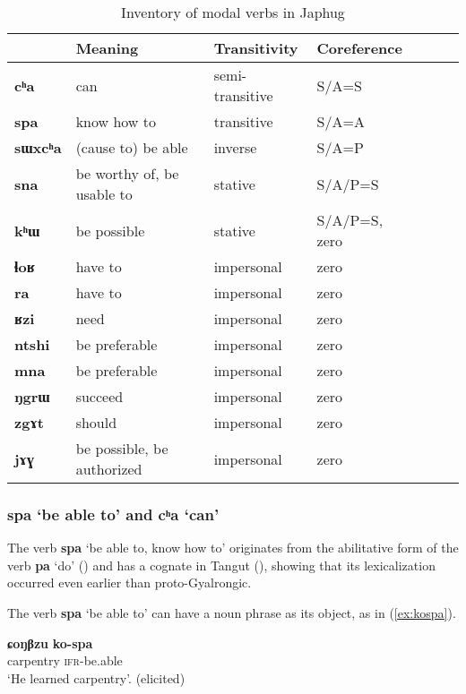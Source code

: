 \documentclass[oneside,a4paper,11pt]{article}
\newcommand{\ipa}[1]{\textbf{\phon#1}} %
\newcommand{\jpg}[2]{\ipa{#1} `#2'} %
\newcommand{\refb}[1]{(\ref{#1})}
\begin{document}
\begin{table}[H]
\caption{Inventory of modal verbs in Japhug} \centering \label{tab:modal.verbs}
\begin{tabular}{lllllll}
\toprule
 & 	Meaning & 	Transitivity & 	Coreference & 	\\
 \midrule
\ipa{cʰa} & 	can & 	semi-transitive & 	S/A=S & 	\\
\ipa{spa} & 	know how to & 	transitive & 	S/A=A & 	\\
\ipa{sɯxcʰa} & 	(cause to) be able & 	inverse & 	S/A=P & 	\\
\ipa{sna} & 	be worthy of, be usable to & 	stative & 	S/A/P=S & 	\\
\ipa{kʰɯ} & 	be possible & 	stative & 	S/A/P=S, zero & 	\\
\midrule
\ipa{ɬoʁ} & 	have to & 	impersonal & 	zero & 	\\
\ipa{ra} & 	have to & 	impersonal & 	zero & 	\\
\ipa{ʁzi} & 	need & 	impersonal & 	zero & 	\\
\ipa{ntshi} & 	be preferable & 	impersonal & 	zero & 	\\
\ipa{mna} & 	be preferable & 	impersonal & 	zero & 	\\
\ipa{ŋgrɯ} & 	succeed & 	impersonal & 	zero & 	\\
\ipa{zgɤt} & 	should & 	impersonal & 	zero & 	\\
\ipa{jɤɣ} & 	be possible, be authorized & 	impersonal & 	zero & 	\\
\bottomrule
\end{tabular}
\end{table}

\subsubsection{\jpg{spa}{be able to} and \jpg{cʰa}{can}} \label{sec:spa}
The verb \jpg{spa}{be able to, know how to} originates from the abilitative form of the verb \ipa{pa} `do' (\citealt{jacques15causative}) and has a cognate in Tangut  (\citealt{jacques14esquisse}), showing that its lexicalization occurred even earlier than proto-Gyalrongic.

The verb \jpg{spa}{be able to} can have a noun phrase as its object, as  in \refb{ex:kospa}.

\begin{exe}
\ex \label{ex:kospa}
\gll \ipa{ɕoŋβzu}	\ipa{ko-spa} \\
carpentry \textsc{ifr}-be.able \\
\glt `He learned carpentry'. (elicited)
\end{exe}
\end{document}
